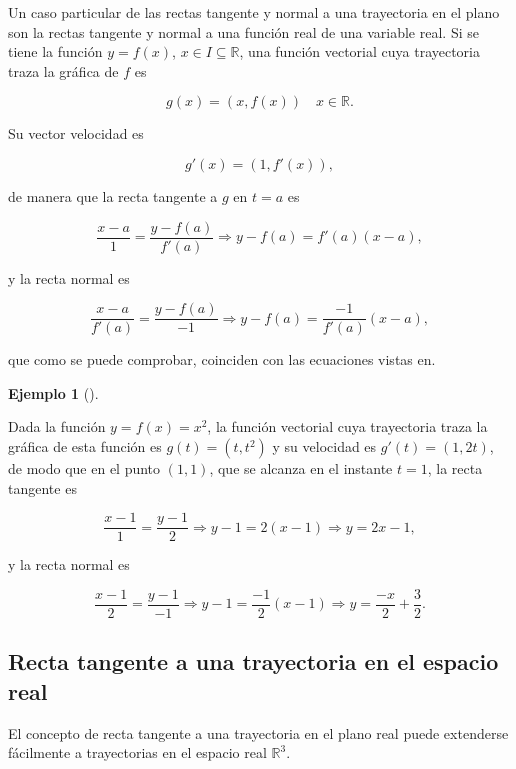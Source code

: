 \documentclass[
  a4paper,
]{scrreport}
\theoremstyle{definition}
\newtheorem{example}{Ejemplo}[chapter]
\theoremstyle{plain}
\theoremstyle{plain}
\theoremstyle{plain}
\theoremstyle{definition}
\theoremstyle{remark}
\begin{document}
Un caso particular de las rectas tangente y normal a una trayectoria en
el plano son la rectas tangente y normal a una función real de una
variable real. Si se tiene la función \(y=f(x)\),
\(x\in I\subseteq \mathbb{R}\), una función vectorial cuya trayectoria
traza la gráfica de \(f\) es

\[
g(x) = (x,f(x))  \quad x\in \mathbb{R}.
\]

Su vector velocidad es

\[g'(x) = (1,f'(x)),\]

de manera que la recta tangente a \(g\) en \(t=a\) es

\[
\frac{x-a}{1} = \frac{y-f(a)}{f'(a)} \Rightarrow y-f(a) = f'(a)(x-a),
\]

y la recta normal es

\[
\frac{x-a}{f'(a)} = \frac{y-f(a)}{-1} \Rightarrow y-f(a) = \frac{-1}{f'(a)}(x-a),
\]

que como se puede comprobar, coinciden con las ecuaciones vistas en.

\begin{example}[]\protect\hypertarget{exm-tangente-normal-funcion}{}\label{exm-tangente-normal-funcion}

Dada la función \(y=f(x)=x^2\), la función vectorial cuya trayectoria
traza la gráfica de esta función es \(g(t)=(t,t^2)\) y su velocidad es
\(g'(t)=(1,2t)\), de modo que en el punto \((1,1)\), que se alcanza en
el instante \(t=1\), la recta tangente es

\[
\frac{x-1}{1} = \frac{y-1}{2} \Rightarrow y-1 = 2(x-1) \Rightarrow y = 2x-1,
\]

y la recta normal es

\[
\frac{x-1}{2} = \frac{y-1}{-1} \Rightarrow y-1 = \frac{-1}{2}(x-1) \Rightarrow y = \frac{-x}{2}+\frac{3}{2}.
\]

\end{example}

\hypertarget{recta-tangente-a-una-trayectoria-en-el-espacio-real}{%
\subsection{Recta tangente a una trayectoria en el espacio
real}\label{recta-tangente-a-una-trayectoria-en-el-espacio-real}}

El concepto de recta tangente a una trayectoria en el plano real puede
extenderse fácilmente a trayectorias en el espacio real
\(\mathbb{R}^3\).
\end{document}
